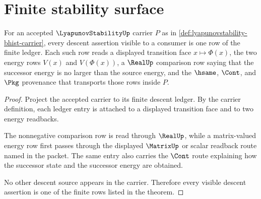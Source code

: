 \section{Finite stability surface}
\label{sec:lyapunovstability-stability-surface}

\begin{theorem}
\label{thm:lyapunovstability-energy-descent-obligation}
For an accepted $\LyapunovStabilityUp$ carrier $P$ as in \autoref{def:lyapunovstability-bhist-carrier}, every descent assertion visible to a consumer is one row of the finite ledger. Each such row reads a displayed transition face $x\mapsto \Phi(x)$, the two energy rows $V(x)$ and $V(\Phi(x))$, a $\RealUp$ comparison row saying that the successor energy is no larger than the source energy, and the $\hsame$, $\Cont$, and $\Pkg$ provenance that transports those rows inside $P$.
\end{theorem}
\begin{proof}
Project the accepted carrier to its finite descent ledger. By the carrier definition, each ledger entry is attached to a displayed transition face and to two energy readbacks.

The nonnegative comparison row is read through $\RealUp$, while a matrix-valued energy row first passes through the displayed $\MatrixUp$ or scalar readback route named in the packet. The same entry also carries the $\Cont$ route explaining how the successor state and the successor energy are obtained.

No other descent source appears in the carrier. Therefore every visible descent assertion is one of the finite rows listed in the theorem.
\end{proof}

